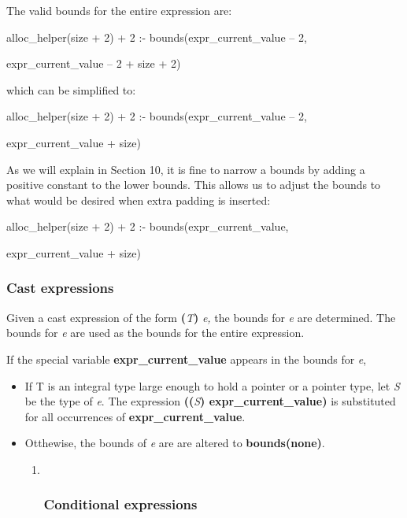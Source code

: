 \documentclass[]{article}
\begin{document}
The valid bounds for the entire expression are:

alloc\_helper(size + 2) + 2 :- bounds(expr\_current\_value -- 2,

expr\_current\_value -- 2 + size + 2)

which can be simplified to:

alloc\_helper(size + 2) + 2 :- bounds(expr\_current\_value -- 2,

expr\_current\_value + size)

As we will explain in Section 10, it is fine to narrow a bounds by
adding a positive constant to the lower bounds. This allows us to adjust
the bounds to what would be desired when extra padding is inserted:

alloc\_helper(size + 2) + 2 :- bounds(expr\_current\_value,

expr\_current\_value + size)

\subsubsection{\texorpdfstring{\protect\hypertarget{ux5fToc437460780}{}{\protect\hypertarget{ux5fToc440445459}{}{\protect\hypertarget{ux5fToc440449241}{}{\protect\hypertarget{ux5fToc440551891}{}{\protect\hypertarget{ux5fToc435434954}{}{}}}}}Cast
expressions}{Cast expressions}}\label{cast-expressions}

Given a cast expression of the form \textbf{(}\emph{T}\textbf{)}
\emph{e,} the bounds for \emph{e} are determined. The bounds for
\emph{e} are used as the bounds for the entire expression.

If the special variable \textbf{expr\_current\_value} appears in the
bounds for \emph{e},

\begin{itemize}
\item
  If T is an integral type large enough to hold a pointer or a pointer
  type, let \emph{S} be the type of \emph{e}. The expression
  \textbf{((}\emph{S}\textbf{) expr\_current\_value)} is substituted for
  all occurrences of \textbf{expr\_current\_value}.
\item
  Otthewise, the bounds of \emph{e} are are altered to
  \textbf{bounds(none)}.

  \begin{enumerate}
  \def\labelenumi{\arabic{enumi}.}
  \item ~
    \subsubsection{\texorpdfstring{\protect\hypertarget{ux5fToc437460781}{}{\protect\hypertarget{ux5fToc440445460}{}{\protect\hypertarget{ux5fToc440449242}{}{\protect\hypertarget{ux5fToc440551892}{}{}}}}Conditional
    expressions}{Conditional expressions}}\label{conditional-expressions}
  \end{enumerate}
\end{itemize}
\end{document}
